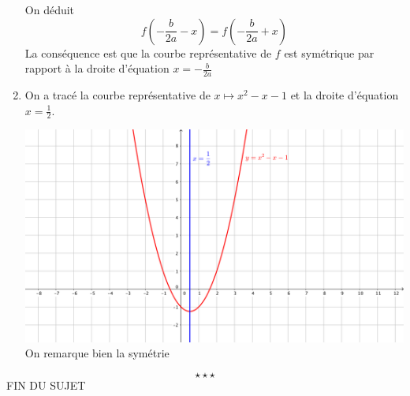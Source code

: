 \begin{enumerate}
On déduit 
$$\boxed{f\left(-\frac{b}{2a} - x\right) = f\left(-\frac{b}{2a} +x\right)}$$
La conséquence est que la courbe représentative de $f$ est symétrique par rapport à la droite d'équation $x=-\frac{b}{2a}$
\item On a tracé la courbe représentative de $x\mapsto x^2-x-1$ et la droite d'équation $x=\frac{1}{2}$. \newline

\center
\includegraphics[scale=0.7]{chap1_corr_ill2.png}
\flushleft
On remarque bien la symétrie
\end{enumerate}
$$\star \star \star$$
\center
FIN DU SUJET
